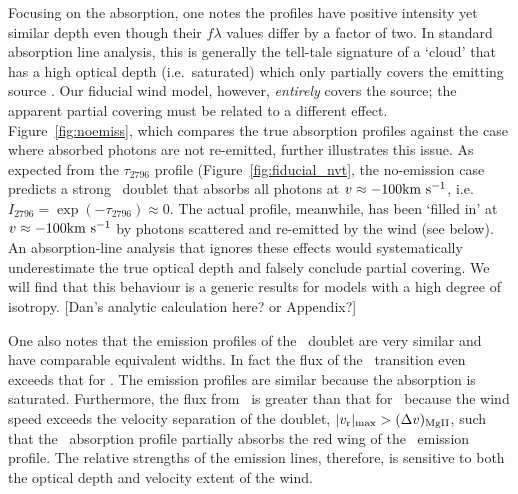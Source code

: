 \documentclass[12pt,preprint]{aastex}
\begin{document}
Focusing on the  absorption, one notes the profiles have
positive intensity yet similar depth even though their $f\lambda$
values differ by a factor of two.  In standard absorption line
analysis, this is generally 
the tell-tale signature of a `cloud' that has a high optical depth (i.e.\
saturated) which only partially covers the emitting source
\citep[e.g.][]{hamman10}.  Our fiducial wind model, however, 
{\it entirely} covers the source; the apparent partial covering must
be related to a different effect.
Figure~\ref{fig:noemiss}, which compares the true
absorption profiles against the case where absorbed photons are not
re-emitted, further illustrates this issue.   As expected from the
$\tau_{2796}$ profile (Figure~\ref{fig:fiducial_nvt}, the no-emission
case predicts a strong \mgiid\ doublet that absorbs all photons at
$v \approx -100 {\rm km~s^{-1}}$, i.e.\ $I_{2796} = \exp(-\tau_{2796}) \approx 0$.
The actual profile, meanwhile, has been `filled in' at $v \approx -100
{\rm km~s^{-1}}$ by photons scattered and re-emitted by the wind (see below).  An
absorption-line analysis that ignores these effects
\citep[e.g.][]{sato} would systematically underestimate the true optical
depth and falsely conclude partial covering.  We will find that this
behaviour is a generic results for models with a high degree of
isotropy.
[Dan's analytic calculation here? or Appendix?]

One also notes that the emission profiles of the \mgiid\ doublet
are very similar and have comparable equivalent widths.  In fact the
flux of the \mgiib\ transition even exceeds that for \mgiia.  The
emission profiles are similar because the absorption is saturated.
Furthermore, the flux from \mgiib\ is greater than that for
\mgiia\ because the wind speed exceeds the velocity separation
of the doublet, $|v_{\rm r}|_{\rm max} > (\Delta v)_{\rm MgII}$, such
that the \mgiib\ absorption profile partially absorbs the red wing of the
\mgiia\ emission profile.  The relative strengths of the emission
lines, therefore, is sensitive to both the optical depth and velocity
extent of the wind.
\end{document}
